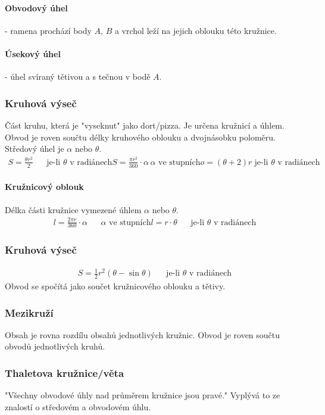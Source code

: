 \documentclass[12pt]{article}
\begin{document}
\paragraph{Obvodový úhel} - ramena prochází body $A$, $B$ a vrchol leží na jejich oblouku této kružnice.
\paragraph{Úsekový úhel} - úhel svíraný tětivou a s tečnou v bodě $A$.
\subsubsection{Kruhová výseč}
Část kruhu, která je "vyseknut" jako dort/pizza. Je určena kružnicí a úhlem. Obvod je  roven součtu délky kruhového oblouku a dvojnásobku poloměru. Středový úhel je $\alpha$ nebo $\theta$.
\begin{align}
S = \frac{\theta r^2}{2} && \text{je-li $\theta$ v radiánech}
S = \frac{\pi r^2}{360} \cdot \alpha  && \text{$\alpha$ ve stupních}
o = (\theta +2)r  && \text{je-li $\theta$ v radiánech}
\end{align}
\paragraph{Kružnicový oblouk}
Délka části kružnice vymezené úhlem $\alpha$ nebo $\theta$.
\begin{align}
l = \frac{2 \pi r}{360} \cdot \alpha && \text{$\alpha$ ve stupních}
l = r \cdot \theta && \text{je-li $\theta$ v radiánech}
\end{align}

\subsubsection{Kruhová výseč}
\begin{align}
S = \frac{1}{2}r^2(\theta-\sin\theta) && \text{je-li $\theta$ v radiánech}
\end{align}
Obvod se spočítá jako součet kružnicového oblouku a tětivy.
\subsubsection{Mezikruží}
Obsah je rovna rozdílu obsahů jednotlivých kružnic. Obvod je roven součtu obvodů jednotlivých kruhů.
\subsubsection{Thaletova kružnice/věta}
"Všechny obvodové úhly nad průměrem kružnice jsou pravé." Vyplývá to ze znalostí o středovém a obvodovém úhlu.
\end{document}
